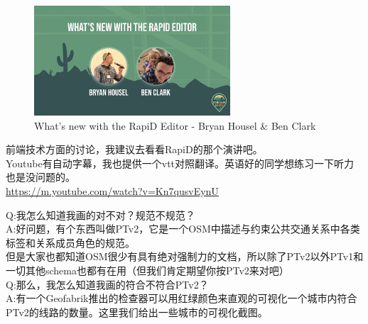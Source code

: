 \documentclass{beamer}
\begin{document}
\begin{frame}
	\begin{figure}[H]
		\centering
		\includegraphics[width=0.65\textwidth]{figure/youtube-Kn7qusvEynU.jpg}
		\caption{What's new with the RapiD Editor - Bryan Housel \& Ben Clark}
	\end{figure}
	
	\quad \quad 前端技术方面的讨论，我建议去看看RapiD的那个演讲吧。\\
	\quad \quad Youtube有自动字幕，我也提供一个vtt对照翻译。英语好的同学想练习一下听力也是没问题的。 \\
	\quad \quad \url{https://m.youtube.com/watch?v=Kn7qusvEynU}
\end{frame}

\begin{frame}
	Q:我怎么知道我画的对不对？规范不规范？\\
	
	A:好问题，有个东西叫做PTv2，它是一个OSM中描述与约束公共交通关系中各类标签和关系成员角色的规范。\\
	但是大家也都知道OSM很少有具有绝对强制力的文档，所以除了PTv2以外PTv1和一切其他schema也都有在用（但我们肯定期望你按PTv2来对吧）\\
	
	Q:那么，我怎么知道我画的符合不符合PTv2？\\
	
	A:有一个Geofabrik推出的检查器可以用红绿颜色来直观的可视化一个城市内符合PTv2的线路的数量。这里我们给出一些城市的可视化截图。
\end{frame}
\end{document}

